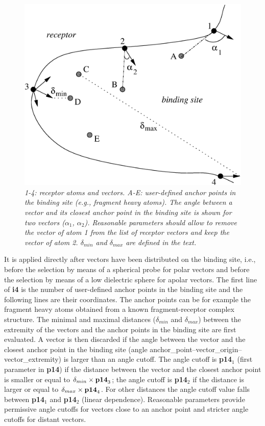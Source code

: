 \documentclass[a4paper,12pt,titlepage]{article}
\begin{document}
\begin{figure}[h]
\begin{center}
\includegraphics[scale=0.5]{figures/angle_select.eps}
\end{center}
\caption{\it
1-4: receptor atoms and vectors. A-E: user-defined anchor points in the binding site 
(e.g., fragment heavy atoms). The angle between a vector and its closest anchor point in 
the binding site is shown for two vectors ($\alpha_1$, $\alpha_2$). Reasonable 
parameters should allow to remove the vector of atom 1 from the list of receptor 
vectors and keep the vector of atom 2. 
$\delta_{min}$ and $\delta_{max}$ are defined in the text. 
}
\end{figure}

\noindent
It is applied directly after vectors have been distributed on the binding site, i.e., before the 
selection by means of a spherical probe for polar vectors and before the selection by means 
of a low dielectric sphere for apolar vectors. 
The first line of {\bf i4} is the number of user-defined anchor points in the binding site and 
the following lines are their coordinates. The anchor points can be for example the fragment heavy 
atoms obtained from a known fragment-receptor complex structure. The minimal and maximal distances 
($\delta_{min}$ and $\delta_{max}$) between the extremity of the vectors and the anchor points 
in the binding site are first evaluated. A vector is then discarded 
if the angle between the vector and the closest anchor point in the binding site 
(angle anchor\_point--vector\_origin--vector\_extremity) is larger than an angle cutoff. 
The angle cutoff is {\bf p14}$_1$ (first parameter in {\bf p14}) if the distance between the 
vector and the closest anchor point is smaller or equal to $\delta_{min} \times {\bf p14}_3$; 
the angle cutoff is {\bf p14}$_2$ if the distance is larger or equal to 
$\delta_{max} \times {\bf p14}_4$. 
For other distances the angle cutoff value falls between {\bf p14}$_1$ and 
{\bf p14}$_2$ (linear dependence). 
Reasonable parameters provide permissive angle cutoffs for vectors close to an 
anchor point and stricter angle cutoffs for distant vectors.
\end{document}
